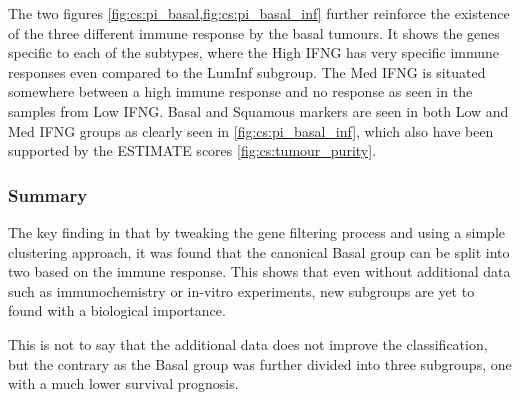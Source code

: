 The two figures \cref{fig:cs:pi_basal,fig:cs:pi_basal_inf} further reinforce the existence of the three different immune response by the basal tumours. It shows the genes specific to each of the subtypes, where the High IFNG has very specific immune responses even compared to the LumInf subgroup. The Med IFNG is situated somewhere between a high immune response and no response as seen in the samples from Low IFNG. Basal and Squamous markers are seen in both Low and Med IFNG groups as clearly seen in \cref{fig:cs:pi_basal_inf}, which also have been supported by the ESTIMATE scores \cref{fig:cs:tumour_purity}.










\subsubsection{Summary}

The key finding in that by tweaking the gene filtering process and using a simple clustering approach, it was found that the canonical Basal group can be split into two based on the immune response. This shows that even without additional data such as immunochemistry or in-vitro experiments, new subgroups are yet to found with a biological importance.

This is not to say that the additional data does not improve the classification, but the contrary as the Basal group was further divided into three subgroups, one with a much lower survival prognosis. 



